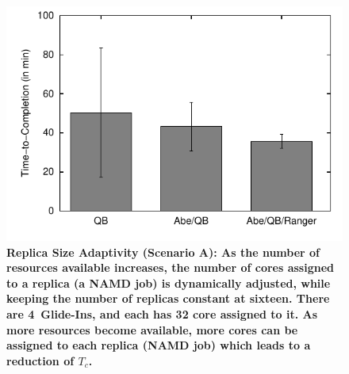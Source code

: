 \documentclass{rspublic}
\begin{document}
\begin{figure}[h]
  \begin{minipage}[t]{.48\textwidth}
    \begin{center}  
      \includegraphics[width=\textwidth]{performance/perf_distributed_size_replica.pdf}
      \caption{\footnotesize \bf Replica Size Adaptivity (Scenario A):
        As the number of resources available increases, the number of
        cores assigned to a replica (a NAMD job) is dynamically
        adjusted, while keeping the number of replicas constant at
        sixteen.  There are 4~Glide-Ins, and each has 32 core assigned
        to it.  As more resources become available, more cores can be
        assigned to each replica (NAMD job) which leads to a reduction
        of $T_{c}$.  }
      \label{fig:performance_perf_distributed_A}
    \end{center}
  \end{minipage}
  \hfill
  \begin{minipage}[t]{.485\textwidth}
    \begin{center}  
     

\end{center}
\end{minipage}
\end{figure}
\end{document}
